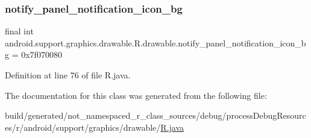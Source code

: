 \subsubsection{\texorpdfstring{notify\_panel\_notification\_icon\_bg}{notify\_panel\_notification\_icon\_bg}}
{\footnotesize\ttfamily final int android.\+support.\+graphics.\+drawable.\+R.\+drawable.\+notify\+\_\+panel\+\_\+notification\+\_\+icon\+\_\+bg = 0x7f070080\hspace{0.3cm}{\ttfamily [static]}}



Definition at line 76 of file R.\+java.



The documentation for this class was generated from the following file\+:\begin{DoxyCompactItemize}
\item 
build/generated/not\+\_\+namespaced\+\_\+r\+\_\+class\+\_\+sources/debug/process\+Debug\+Resources/r/android/support/graphics/drawable/\mbox{\hyperlink{android_2support_2graphics_2drawable_2_r_8java}{R.\+java}}\end{DoxyCompactItemize}
